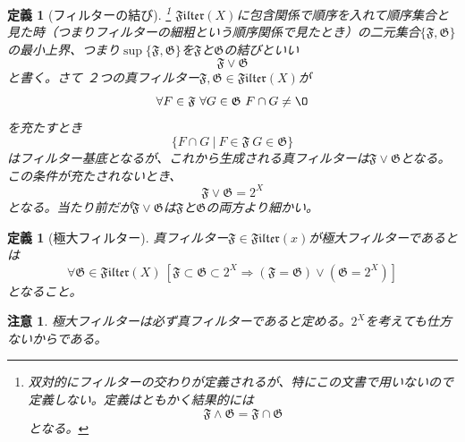 \documentclass[leqno]{jsarticle}
\newtheorem{df}[thm]{定義}
\newtheorem*{cau}{注意}
\newcommand{\To}{\Longrightarrow}
\newcommand{\ff}{\mathfrak{F}}
\newcommand{\GG}{\mathfrak{G}}
\newcommand{\fil}{\mathfrak{Filter}}
\begin{document}
\begin{df}[フィルターの結び]\footnote{双対的にフィルターの交わりが定義されるが、特にこの文書で用いないので定義しない。定義はともかく結果的には
\[
\ff\land\GG=\ff\cap\GG
\]
となる。}
$\fil(X)$に包含関係で順序を入れて順序集合と見た時（つまりフィルターの細粗という順序関係で見たとき）の二元集合$\{\ff,\GG\}$の最小上界、つまり$\sup\{\ff,\GG\}$を$\ff$と$\GG$の結びといい　
\[
\ff\vee \GG
\]
と書く。さて
２つの真フィルター$\ff,\GG\in \fil(X)$が
\[
\forall F\in \ff\ \forall G\in \GG\ F\cap G\neq\O
\]を充たすとき
\[
\{F\cap G\ |\ F\in \ff\ G\in \GG\}
\]
はフィルター基底となるが、これから生成される真フィルターは$\ff \vee\GG$となる。この条件が充たされないとき、
\[
\ff\vee \GG=2^X
\]
となる。当たり前だが$\ff\vee\GG$は$\ff$と$\GG$の両方より細かい。
\end{df}

\begin{df}[極大フィルター]真フィルター$\ff \in \fil(x)$が極大フィルターであるとは
\[
\forall \GG\in \fil(X)\ [\ff \subset \GG\subset 2^X\To (\ff=\GG)\lor (\GG= 2^X)] 
\]
となること。
\end{df}
\begin{cau}
極大フィルターは必ず真フィルターであると定める。$2^X$を考えても仕方ないからである。
\end{cau}
\end{document}
